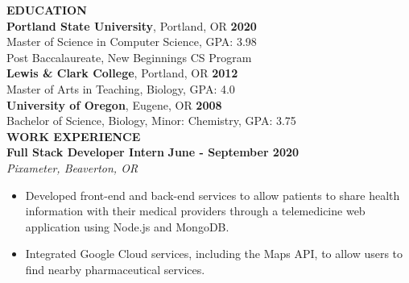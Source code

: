 \documentclass[11pt]{article}
\begin{document}
\smallskip
\noindent
\makebox[0pt][l]{\rule[-.2\baselineskip]{\linewidth}{.3mm}}%
\large{\textbf{EDUCATION}} \smallskip \\
%
\textbf{Portland State University}, Portland, OR
\hfill \textbf{2020}\\ 
Master of Science in Computer Science, GPA: 3.98\\
Post Baccalaureate, New Beginnings CS Program %
\medskip \\
%
\textbf{Lewis \& Clark College}, Portland, OR
\hfill \textbf{2012} \\
Master of Arts in Teaching, Biology, GPA: 4.0\medskip \\
%
\textbf{University of Oregon}, Eugene, OR
\hfill \textbf{2008}\\
Bachelor of Science, Biology, Minor: Chemistry, GPA: 3.75 \bigskip \\
\makebox[0pt][l]{\rule[-.2\baselineskip]{\linewidth}{.3mm}}%
\large{\textbf{WORK EXPERIENCE}}\smallskip \\
%
\textbf{Full Stack Developer Intern} \hfill \textbf{June - September 2020}\\
\textit{Pixameter, Beaverton, OR}
\begin{itemize}[leftmargin=*, itemsep=0pt, topsep=5pt]
	\item Developed front-end and back-end services to allow patients to share health information with their medical providers through a telemedicine web application using Node.js and MongoDB.
	\item Integrated Google Cloud services, including the Maps API, to allow users to find nearby pharmaceutical services.
\end{itemize}
\end{document}
